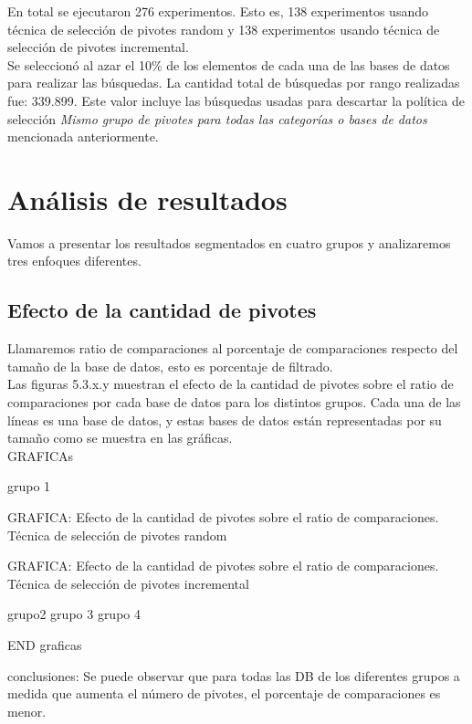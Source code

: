 En total se ejecutaron 276 experimentos. Esto es, 138 experimentos usando t\'ecnica de selecci\'on de pivotes random y 138 experimentos usando t\'ecnica de selecci\'on de pivotes incremental.\\

Se seleccion\'o al azar el 10\% de los elementos de cada una de las bases de datos para realizar las b\'usquedas. La cantidad total de b\'usquedas por rango realizadas fue: 339.899. Este valor incluye las b\'usquedas usadas para descartar la pol\'itica de selecci\'on \textit{Mismo grupo de pivotes para todas las categor\'ias o bases de datos} mencionada anteriormente.\\

\section{An\'alisis de resultados}

Vamos a presentar los resultados segmentados en cuatro grupos y analizaremos tres enfoques diferentes.\\

\subsection{Efecto de la cantidad de pivotes}

Llamaremos ratio de comparaciones al porcentaje de comparaciones respecto del tamaño de la base de datos, esto es porcentaje de filtrado.\\

Las figuras 5.3.x.y muestran el efecto de la cantidad de pivotes sobre el ratio de comparaciones por cada base de datos para los distintos grupos. Cada una de las l\'ineas es una base de datos, y estas bases de datos est\'an representadas por su tamaño como se muestra en las gr\'aficas.\\

GRAFICAs

grupo 1

GRAFICA: Efecto de la cantidad de pivotes sobre el ratio de comparaciones. T\'ecnica de selecci\'on de pivotes random


GRAFICA: Efecto de la cantidad de pivotes sobre el ratio de comparaciones. T\'ecnica de selecci\'on de pivotes incremental

grupo2
grupo 3
grupo 4 

END graficas

conclusiones:
Se puede observar que para todas las DB de los diferentes grupos a medida que aumenta el n\'umero de pivotes, el porcentaje de comparaciones es menor.\\

